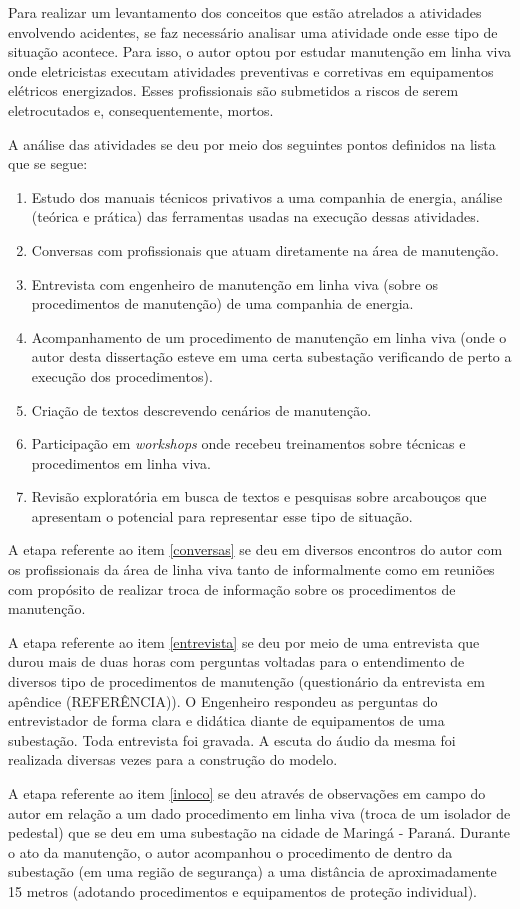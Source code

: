 Para realizar um levantamento dos conceitos que estão atrelados a atividades envolvendo acidentes, se faz necessário analisar uma atividade onde esse tipo de situação acontece. Para isso, o autor optou por estudar manutenção em linha viva onde eletricistas executam atividades preventivas e corretivas em equipamentos elétricos energizados. Esses profissionais são submetidos a riscos de serem eletrocutados e, consequentemente, mortos. 

A análise das atividades se deu por meio dos seguintes pontos definidos na lista que se segue: 
\begin{enumerate}
	\item Estudo dos manuais técnicos privativos a uma companhia de energia, análise (teórica e prática) das ferramentas usadas na execução dessas atividades. \label{estudosprivativos}
	\item Conversas com profissionais que atuam diretamente na área de manutenção. \label{conversas}
	\item Entrevista com engenheiro de manutenção em linha viva (sobre os procedimentos de manutenção) de uma companhia de energia. \label{entrevista}
	\item Acompanhamento de um procedimento de manutenção em linha viva (onde o autor desta dissertação esteve em uma certa subestação verificando de perto a execução dos procedimentos). \label{inloco}
	\item Criação de textos descrevendo cenários de manutenção.
	\item Participação em \textit{workshops} onde recebeu treinamentos sobre técnicas e procedimentos em linha viva.
	\item Revisão exploratória em busca de textos e pesquisas sobre arcabouços que apresentam o potencial para representar esse tipo de situação.
\end{enumerate}

A etapa referente ao item \ref{conversas} se deu em diversos encontros do autor com os profissionais da área de linha viva tanto de informalmente como em reuniões com propósito de realizar troca de informação sobre os procedimentos de manutenção. 

A etapa referente ao item \ref{entrevista} se deu por meio de uma entrevista que durou mais de duas horas com perguntas voltadas para o entendimento de diversos tipo de procedimentos de manutenção (questionário da entrevista em apêndice (REFERÊNCIA)). O Engenheiro respondeu as perguntas do entrevistador de forma clara e didática diante de equipamentos de uma subestação. Toda entrevista foi gravada. A escuta do áudio da mesma foi realizada diversas vezes para a construção do modelo.  

A etapa referente ao item \ref{inloco} se deu através de observações em campo do autor em relação a um dado procedimento em linha viva (troca de um isolador de pedestal) que se deu em uma subestação na cidade de Maringá - Paraná. Durante o ato da manutenção, o autor acompanhou o procedimento de dentro da subestação (em uma região de segurança) a uma distância de aproximadamente 15 metros (adotando procedimentos e equipamentos de proteção individual).   